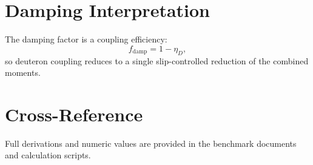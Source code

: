 \documentclass[12pt]{book}
\begin{document}
\section{Damping Interpretation}
The damping factor is a coupling efficiency:
\begin{equation}
f_{\text{damp}} = 1 - \eta_D,
\end{equation}
so deuteron coupling reduces to a single slip-controlled reduction of the combined moments.

\section{Cross-Reference}
Full derivations and numeric values are provided in the benchmark documents and calculation scripts.
\end{document}

